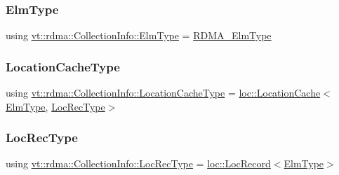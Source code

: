 \subsubsection{\texorpdfstring{Elm\+Type}{ElmType}}
{\footnotesize\ttfamily using \hyperlink{structvt_1_1rdma_1_1_collection_info_a31cd8d00263f9260a6ca3d8e5cbc19e8}{vt\+::rdma\+::\+Collection\+Info\+::\+Elm\+Type} =  \hyperlink{namespacevt_a2c2a902092b72056f70210c159f966f0}{R\+D\+M\+A\+\_\+\+Elm\+Type}}

\mbox{\label{structvt_1_1rdma_1_1_collection_info_a25a687ebde2ae64ae23dd9a7216071be}} 
\subsubsection{\texorpdfstring{Location\+Cache\+Type}{LocationCacheType}}
{\footnotesize\ttfamily using \hyperlink{structvt_1_1rdma_1_1_collection_info_a25a687ebde2ae64ae23dd9a7216071be}{vt\+::rdma\+::\+Collection\+Info\+::\+Location\+Cache\+Type} =  \hyperlink{structvt_1_1location_1_1_location_cache}{loc\+::\+Location\+Cache}$<$\hyperlink{structvt_1_1rdma_1_1_collection_info_a31cd8d00263f9260a6ca3d8e5cbc19e8}{Elm\+Type}, \hyperlink{structvt_1_1rdma_1_1_collection_info_ad1cd4adc9c3afc0f9fb472033423ee4b}{Loc\+Rec\+Type}$>$}

\mbox{\label{structvt_1_1rdma_1_1_collection_info_ad1cd4adc9c3afc0f9fb472033423ee4b}} 
\subsubsection{\texorpdfstring{Loc\+Rec\+Type}{LocRecType}}
{\footnotesize\ttfamily using \hyperlink{structvt_1_1rdma_1_1_collection_info_ad1cd4adc9c3afc0f9fb472033423ee4b}{vt\+::rdma\+::\+Collection\+Info\+::\+Loc\+Rec\+Type} =  \hyperlink{structvt_1_1location_1_1_loc_record}{loc\+::\+Loc\+Record}$<$\hyperlink{structvt_1_1rdma_1_1_collection_info_a31cd8d00263f9260a6ca3d8e5cbc19e8}{Elm\+Type}$>$}



